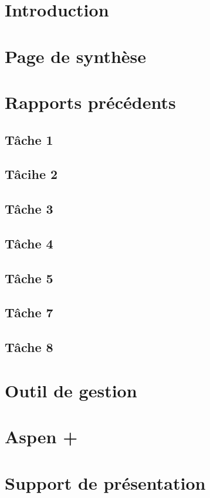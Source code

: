 \documentclass[a4paper,oneside,12pt]{report}
\begin{document}


\tableofcontents

\chapter{Introduction}
%
\chapter{Page de synthèse}
%

\appendix
\chapter{Rapports précédents}

\section{T\^ache 1}
%

\section{T\^acihe 2}
%

\section{T\^ache 3}

\section{T\^ache 4}
%

\section{T\^ache 5}
%

\section{T\^ache 7}
%

\section{T\^ache 8}
%

\chapter{Outil de gestion}
%
\chapter{Aspen +}

\chapter{Support de présentation}


\printbibliography
\end{document}
